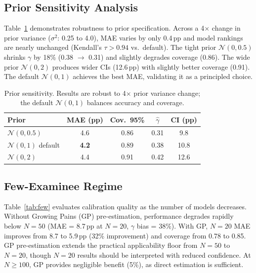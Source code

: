 \documentclass[letterpaper,11pt]{article}
\begin{document}
\subsection{Prior Sensitivity Analysis}
\label{sec:prior}

Table~\ref{tab:prior} demonstrates robustness to prior specification. Across a 4$\times$ change in prior variance ($\sigma^2$: 0.25 to 4.0), MAE varies by only 0.4\,pp and model rankings are nearly unchanged (Kendall's $\tau > 0.94$ vs.\ default). The tight prior $\mathcal{N}(0, 0.5)$ shrinks $\gamma$ by 18\% (0.38 $\to$ 0.31) and slightly degrades coverage (0.86). The wide prior $\mathcal{N}(0, 2)$ produces wider CIs (12.6\,pp) with slightly better coverage (0.91). The default $\mathcal{N}(0, 1)$ achieves the best MAE, validating it as a principled choice.

\begin{table}[t]
\centering
\caption{Prior sensitivity. Results are robust to 4$\times$ prior variance change; the default $\mathcal{N}(0,1)$ balances accuracy and coverage.}
\label{tab:prior}
\small
\begin{tabular}{lcccc}
\toprule
Prior & MAE (pp) & Cov.\ 95\% & $\hat{\gamma}$ & CI (pp) \\
\midrule
$\mathcal{N}(0, 0.5)$ & 4.6 & 0.86 & 0.31 & 9.8 \\
$\mathcal{N}(0, 1)$ default & \textbf{4.2} & 0.89 & 0.38 & 10.8 \\
$\mathcal{N}(0, 2)$ & 4.4 & 0.91 & 0.42 & 12.6 \\
\bottomrule
\end{tabular}
\end{table}

\subsection{Few-Examinee Regime}
\label{sec:few_examinee}

Table~\ref{tab:few} evaluates calibration quality as the number of models decreases. Without Growing Pains (GP) pre-estimation, performance degrades rapidly below $N=50$ (MAE = 8.7\,pp at $N=20$, $\gamma$ bias = 38\%). With GP, $N=20$ MAE improves from 8.7 to 5.9\,pp (32\% improvement) and coverage from 0.78 to 0.85. GP pre-estimation extends the practical applicability floor from $N=50$ to $N=20$, though $N=20$ results should be interpreted with reduced confidence. At $N \geq 100$, GP provides negligible benefit (5\%), as direct estimation is sufficient.
\end{document}
